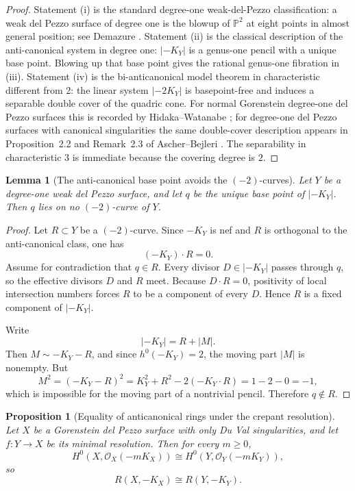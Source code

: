 \documentclass[11pt]{article}
\newtheorem{proposition}[theorem]{Proposition}
\newtheorem{lemma}[theorem]{Lemma}
\theoremstyle{definition}
\newcommand{\Pbb}{\mathbb P}
\begin{document}
\begin{proof}
Statement (i) is the standard degree-one weak-del-Pezzo classification: a weak del Pezzo surface of degree one is the blowup of $\Pbb^2$ at eight points in almost general position; see Demazure \cite{Demazure80}. Statement (ii) is the classical description of the anti-canonical system in degree one: $|-K_Y|$ is a genus-one pencil with a unique base point. Blowing up that base point gives the rational genus-one fibration in (iii). Statement (iv) is the bi-anticanonical model theorem in characteristic different from $2$: the linear system $|-2K_Y|$ is basepoint-free and induces a separable double cover of the quadric cone. For normal Gorenstein degree-one del Pezzo surfaces this is recorded by Hidaka--Watanabe \cite{HW81}; for degree-one del Pezzo surfaces with canonical singularities the same double-cover description appears in Proposition~2.2 and Remark~2.3 of Ascher--Bejleri \cite{AscherBejleri21}. The separability in characteristic $3$ is immediate because the covering degree is $2$.
\end{proof}

\begin{lemma}[The anti-canonical base point avoids the $(-2)$-curves]\label{lem:basepoint-avoids-minus2}
Let $Y$ be a degree-one weak del Pezzo surface, and let $q$ be the unique base point of $|-K_Y|$. Then $q$ lies on no $(-2)$-curve of $Y$.
\end{lemma}

\begin{proof}
Let $R\subset Y$ be a $(-2)$-curve. Since $-K_Y$ is nef and $R$ is orthogonal to the anti-canonical class, one has
\[
(-K_Y)\cdot R=0.
\]
Assume for contradiction that $q\in R$. Every divisor $D\in |-K_Y|$ passes through $q$, so the effective divisors $D$ and $R$ meet. Because $D\cdot R=0$, positivity of local intersection numbers forces $R$ to be a component of every $D$. Hence $R$ is a fixed component of $|-K_Y|$.

Write
\[
|-K_Y| = R + |M|.
\]
Then $M\sim -K_Y-R$, and since $h^0(-K_Y)=2$, the moving part $|M|$ is nonempty. But
\[
M^2 = (-K_Y-R)^2 = K_Y^2 + R^2 - 2(-K_Y\cdot R)=1-2-0=-1,
\]
which is impossible for the moving part of a nontrivial pencil. Therefore $q\notin R$.
\end{proof}

\begin{proposition}[Equality of anticanonical rings under the crepant resolution]\label{prop:ring-equality}
Let $X$ be a Gorenstein del Pezzo surface with only Du Val singularities, and let $f\colon Y\to X$ be its minimal resolution. Then for every $m\ge 0$,
\[
H^0(X,\mathcal O_X(-mK_X))\cong H^0(Y,\mathcal O_Y(-mK_Y)),
\]
so
\[
R(X,-K_X)\cong R(Y,-K_Y).
\]
\end{proposition}
\end{document}
